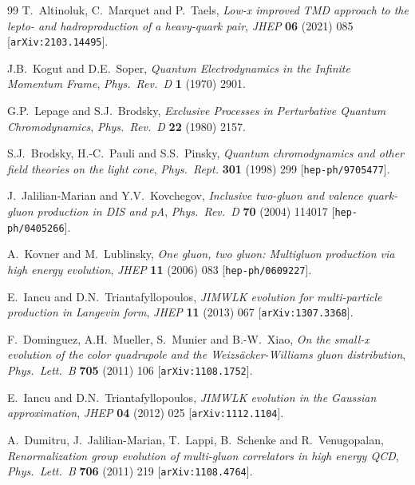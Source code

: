 \documentclass[11pt,a4paper]{article}
\numberwithin{equation}{section}
\begin{document}
\begin{thebibliography}{99}
T.~Altinoluk, C.~Marquet and P.~Taels, \emph{Low-x improved TMD approach to the lepto- and
hadroproduction of a heavy-quark pair}, \emph{JHEP} {\bf 06} (2021) 085
[\texttt{arXiv:2103.14495}].

J.B.~Kogut and D.E.~Soper, \emph{Quantum Electrodynamics in the Infinite Momentum Frame},
\emph{Phys.\ Rev.\ D} {\bf 1} (1970) 2901.

G.P.~Lepage and S.J.~Brodsky, \emph{Exclusive Processes in Perturbative Quantum
Chromodynamics}, \emph{Phys.\ Rev.\ D} {\bf 22} (1980) 2157.

S.J.~Brodsky, H.-C.~Pauli and S.S.~Pinsky, \emph{Quantum chromodynamics and other field
theories on the light cone}, \emph{Phys.\ Rept.} {\bf 301} (1998) 299
[\texttt{hep-ph/9705477}].

J.~Jalilian-Marian and Y.V.~Kovchegov, \emph{Inclusive two-gluon and valence quark-gluon
production in DIS and pA}, \emph{Phys.\ Rev.\ D} {\bf 70} (2004) 114017
[\texttt{hep-ph/0405266}].

A.~Kovner and M.~Lublinsky, \emph{One gluon, two gluon: Multigluon production via high
energy evolution}, \emph{JHEP} {\bf 11} (2006) 083 [\texttt{hep-ph/0609227}].

E.~Iancu and D.N.~Triantafyllopoulos, \emph{JIMWLK evolution for multi-particle production
in Langevin form}, \emph{JHEP} {\bf 11} (2013) 067 [\texttt{arXiv:1307.3368}].

F.~Dominguez, A.H.~Mueller, S.~Munier and B.-W.~Xiao, \emph{On the small-x evolution of the
color quadrupole and the Weizs\"acker-Williams gluon distribution}, \emph{Phys.\ Lett.\ B}
{\bf 705} (2011) 106 [\texttt{arXiv:1108.1752}].

E.~Iancu and D.N.~Triantafyllopoulos, \emph{JIMWLK evolution in the Gaussian approximation},
\emph{JHEP} {\bf 04} (2012) 025 [\texttt{arXiv:1112.1104}].

A.~Dumitru, J.~Jalilian-Marian, T.~Lappi, B.~Schenke and R.~Venugopalan,
\emph{Renormalization group evolution of multi-gluon correlators in high energy QCD},
\emph{Phys.\ Lett.\ B} {\bf 706} (2011) 219 [\texttt{arXiv:1108.4764}].

\end{thebibliography}
\end{document}
